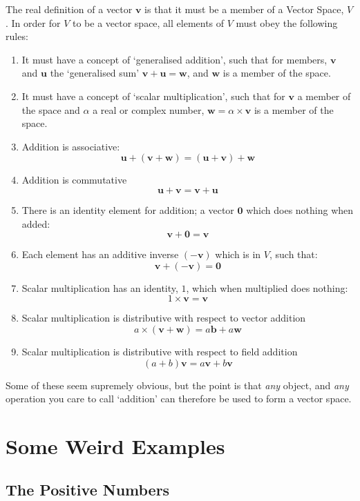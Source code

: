 \documentclass[a4paper,openany,11pt]{book}
\renewcommand\vec[1]{\boldsymbol{\mathbf{#1}}}
\begin{document}
			The real definition of a vector $\vec{v}$ is that it must be a member of a Vector Space, $V$. In order for $V$ to be a vector space, all elements of $V$ must obey the following rules:

			\begin{enumerate}
				\item It must have a concept of `generalised addition', such that for members, $\vec{v}$ and $\vec{u}$ the `generalised sum' $\vec{v} + \vec{u} = \vec{w}$, and $\vec{w}$ is a member of the space. 
				\item It must have a concept of `scalar multiplication', such that for $\vec{v}$ a member of the space and $\alpha$ a real or complex number, $\vec{w} = \alpha \times \vec{v}$ is a member of the space.
				\item Addition is associative:
				$$ \vec{u} + (\vec{v} + \vec{w}) = (\vec{u} + \vec{v}) + \vec{w}$$
				\item Addition is commutative
				$$\vec{u} + \vec{v} = \vec{v} + \vec{u}$$
				\item There is an identity element for addition; a vector $\vec{0}$ which does nothing when added:
				$$ \vec{v} + \vec{0} = \vec{v}$$
				\item Each element has an additive inverse $(-\vec{v})$ which is in $V$, such that:
				$$ \vec{v} + (-\vec{v}) = \vec{0}$$
				\item Scalar multiplication has an identity, $1$, which when multiplied does nothing:
				$$ 1 \times \vec{v} = \vec{v} $$
				\item Scalar multiplication is distributive with respect to vector addition
				$$ a \times (\vec{v} + \vec{w}) = a \vec{b} + a \vec{w}$$
				\item Scalar multiplication is distributive with respect to field addition
				$$ (a + b) \vec{v} = a \vec{v} + b \vec{v}$$
			\end{enumerate}

			Some of these seem supremely obvious, but the point is that \textit{any} object, and \textit{any} operation you care to call `addition' can therefore be used to form a vector space. 

			\section{Some Weird Examples}

				\subsection{The Positive Numbers}
\end{document}

